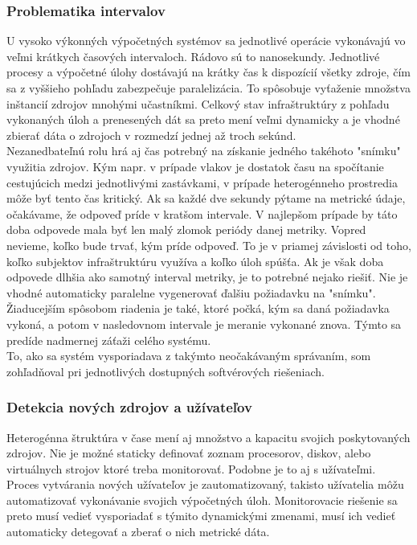 \documentclass[11pt,final,oneside]{fithesis}
\begin{document}
\subsubsection{Problematika intervalov}
U vysoko výkonných výpočetných systémov sa jednotlivé operácie vykonávajú vo veľmi krátkych časových intervaloch. Rádovo sú to nanosekundy. Jednotlivé procesy a výpočetné úlohy dostávajú na krátky čas k dispozícií všetky zdroje, čím 
sa z vyššieho pohľadu zabezpečuje paralelizácia. To spôsobuje vyťaženie množstva inštancií zdrojov mnohými učastníkmi. Celkový stav infraštruktúry z pohľadu vykonaných úloh a prenesených dát sa preto mení veľmi dynamicky a je vhodné
zbierať dáta o zdrojoch v rozmedzí jednej až troch sekúnd. 
\\Nezanedbateľnú rolu hrá aj čas potrebný na získanie jedného takéhoto "snímku" využitia zdrojov. Kým napr. v prípade vlakov je dostatok času na spočítanie cestujúcich medzi jednotlivými zastávkami, v prípade heterogénneho prostredia 
môže byť tento čas kritický. Ak sa každé dve sekundy pýtame na metrické údaje, očakávame, že odpoveď príde v kratšom intervale. V najlepšom prípade by táto doba odpovede mala byť len malý zlomok periódy danej metriky. Vopred nevieme,
koľko bude trvať, kým príde odpoveď. To je v priamej závislosti od toho, koľko subjektov infraštruktúru využíva a koľko úloh spúšťa. Ak je však doba odpovede dlhšia ako samotný interval metriky, je to potrebné nejako riešiť. Nie je 
vhodné automaticky paralelne vygenerovať ďalšiu požiadavku na "snímku". Žiaducejším spôsobom riadenia je také, ktoré počká, kým sa daná požiadavka vykoná, a potom v nasledovnom intervale je meranie vykonané znova. Týmto sa predíde nadmernej záťaži
celého systému.
\\To, ako sa systém vysporiadava z takýmto neočakávaným správaním, som zohľadňoval pri jednotlivých dostupných softvérových riešeniach.

\subsubsection{Detekcia nových zdrojov a užívateľov}
Heterogénna štruktúra v čase mení aj množstvo a kapacitu svojich poskytovaných zdrojov. Nie je možné staticky definovať zoznam procesorov, diskov, alebo virtuálnych strojov ktoré treba monitorovať. Podobne je to aj s užívateľmi. Proces
vytvárania nových užívateľov je zautomatizovaný, takisto užívatelia môžu automatizovať vykonávanie svojich výpočetných úloh. Monitorovacie riešenie sa preto musí vedieť vysporiadať s týmito dynamickými zmenami, musí ich vedieť 
automaticky detegovať a zberať o nich metrické dáta.
\end{document}
